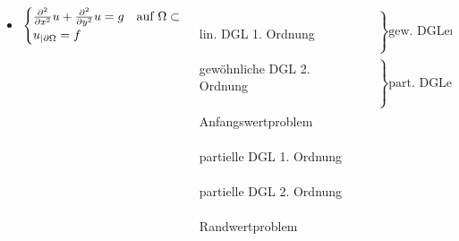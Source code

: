 \begin{frame}
\begin{columns}[T]
\begin{column}{.55\textwidth}
\begin{itemize}
			\item[] $\begin{cases}\frac{\partial^2}{\partial x^2}u+\frac{\partial^2}{\partial y^2}u=g& \text{auf } \Omega \subset \R^2 \\ u_{|\partial \Omega}= f \end{cases}$
		\end{itemize}
	\end{column}%
\hfill%
\begin{column}{.28\textwidth}
\quad\\
lin. DGL 1. Ordnung\\\quad\\
gewöhnliche DGL 2. Ordnung\\\vspace*{-2mm}\underline{\hspace{30mm}}\\
\vspace*{2mm}
Anfangswertproblem\\\underline{\hspace{30mm}}\\\vspace*{2mm}
partielle DGL 1. Ordnung
\\\quad\\
partielle DGL 2. Ordnung\\\vspace*{-2mm}\underline{\hspace{30mm}}\\\vspace*{2mm}
Randwertproblem
\end{column}%
\hfill%
\begin{column}{.24\textwidth}
\vspace{-4mm}
\begin{eqnarray*}
\left.\begin{array}{l} \\ 
\\ \\ \\ \\ \\ \\ \end{array}\right\} \text{gew. DGLen}
\end{eqnarray*}
\vspace{-6mm}
\begin{eqnarray*}
\left.\begin{array}{l} \\ 
\\ \\ \\ \\ \\ \\ \\ \end{array}\right\} \text{part. DGLen}
\end{eqnarray*}
\end{column}%
\end{columns}


\end{frame}
